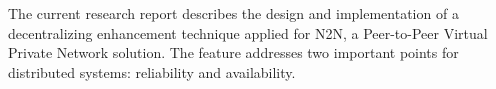 The current research report describes the design and implementation of a decentralizing enhancement technique applied for N2N, a Peer-to-Peer Virtual Private Network solution. The feature addresses two important points for distributed systems: reliability and availability.
